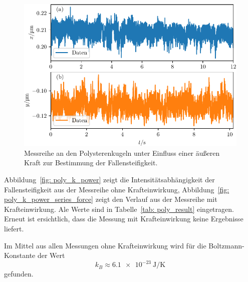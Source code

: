 \begin{figure}
  \centering
  \includegraphics[scale = 1]{../analysis/data/ii_polysteren/70mA/results/with_force_70mA.pdf}
  \caption{Messreihe an den Polysterenkugeln unter Einfluss einer äußeren Kraft zur Bestimmung der Fallensteifigkeit.}
  \label{fig: poly_with_force}
\end{figure}

Abbildung~\ref{fig: poly_k_power} zeigt die Intensitätsabhängigkeit der Fallensteifigkeit aus der Messreihe ohne Krafteinwirkung,
Abbildung~\ref{fig: poly_k_power_series_force} zeigt den Verlauf aus der Messreihe mit Krafteinwirkung. Ale Werte sind in Tabelle~\ref{tab: poly_result}
eingetragen. Erneut ist ersichtlich, dass die Messung mit Krafteinwirkung keine Ergebnisse liefert.

Im Mittel aus allen
Messungen ohne Krafteinwirkung wird für die Boltzmann-Konstante der Wert
\begin{equation}
  k_B \approx \SI{6.1e-23}{\joule\per\kelvin}
\end{equation}
gefunden.

